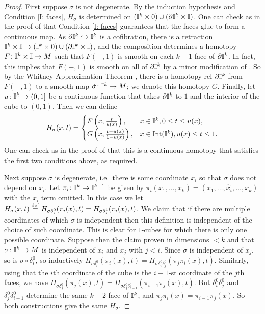 \begin{proof}
	First suppose $\sigma$ is not degenerate. By the induction hypothesis and Condition \eqref{I: faces}, $H_\sigma$ is determined on $(\mathbb{I}^k \times 0) \cup (\partial \mathbb{I}^k \times \mathbb{I})$. One can check as in the proof of \cite[Lemma 18.8]{Lee13} that Condition \eqref{I: faces} guarantees that the faces glue to form a continuous map. As $\partial \mathbb{I}^k \hookrightarrow \mathbb{I}^k$ is a cofibration, there is a retraction $\mathbb{I}^k \times \mathbb{I} \to (\mathbb{I}^k \times 0) \cup (\partial \mathbb{I}^k \times \mathbb{I})$, and the composition determines a homotopy $F \colon \mathbb{I}^k \times \mathbb{I} \to M$ such that $F(-,1)$ is smooth on each $k-1$ face of $\partial \mathbb{I}^k$. In fact, this implies that $F(-,1)$ is smooth on all of $\partial \mathbb{I}^k$ by a minor modification of \cite[Lemma 18.9]{Lee13}. So by the Whitney Approximation Theorem \cite[Theorem 6.26]{Lee13}, there is a homotopy rel $\partial \mathbb{I}^k$ from $F(-,1)$ to a smooth map $\tilde \sigma \colon \mathbb{I}^k \to M$; we denote this homotopy $G$. Finally, let $u \colon \mathbb{I}^k \to (0,1]$ be a continuous function that takes $\partial\mathbb{I}^k$ to $1$ and the interior of the cube to $(0,1)$. Then we can define
	\begin{equation*}
		H_\sigma(x,t) =
		\begin{cases}
			F\left(x,\frac{t}{u(x)}\right),&x \in \mathbb{I}^k, 0 \leq t \leq u(x),\\
			G\left(x,\frac{t-u(x)}{1-u(x)}\right),&x \in \text{Int}(\mathbb{I}^k), u(x) \leq t \leq 1.\\
		\end{cases}
	\end{equation*}
	One can check as in the proof of \cite[Lemma 18.8]{Lee13} that this is a continuous homotopy that satisfies the first two conditions above, as required.

	Next suppose $\sigma$ is degenerate, i.e.\ there is some coordinate $x_i$ so that $\sigma$ does not depend on $x_i$. Let $\pi_i \colon \mathbb{I}^k\to\mathbb{I}^{k-1}$ be given by $\pi_i(x_1,\ldots, x_k) = (x_1,\ldots, \hat x_i, \ldots, x_k)$ with the $x_i$ term omitted. In this case we let $H_\sigma(x,t) \stackrel{\mathrm{def}}{=} H_{\sigma \delta_i^0}(\pi_i(x),t) = H_{\sigma \delta_i^1}(\pi_i(x),t)$.
	We claim that if there are multiple coordinates of which $\sigma$ is independent then this definition is independent of the choice of such coordinate. This is clear for $1$-cubes for which there is only one possible coordinate. Suppose then the claim proven in dimensions $<k$ and that $\sigma \colon \mathbb{I}^k \to M$ is independent of $x_i$ and $x_j$ with $j<i$. Since $\sigma$ is independent of $x_j$, so is $\sigma \circ \delta_i^0$, so inductively $H_{\sigma \delta_i^0}(\pi_i(x),t) = H_{\sigma \delta_i^0\delta_j^0}(\pi_j\pi_i(x),t)$. Similarly, using that the $i$th coordinate of the cube is the $i-1$-st coordinate of the $j$th faces, we have $H_{\sigma \delta_j^0}(\pi_j(x),t) = H_{\sigma \delta_j^0\delta_{i-1}^0}(\pi_{i-1}\pi_j(x),t)$. But $\delta_i^0\delta_j^0$ and $\delta_j^0\delta_{i-1}^0$ determine the same $k-2$ face of $\mathbb{I}^k$, and $\pi_j\pi_i(x) = \pi_{i-1}\pi_j(x)$. So both constructions give the same $H_\sigma$.


\end{proof}
